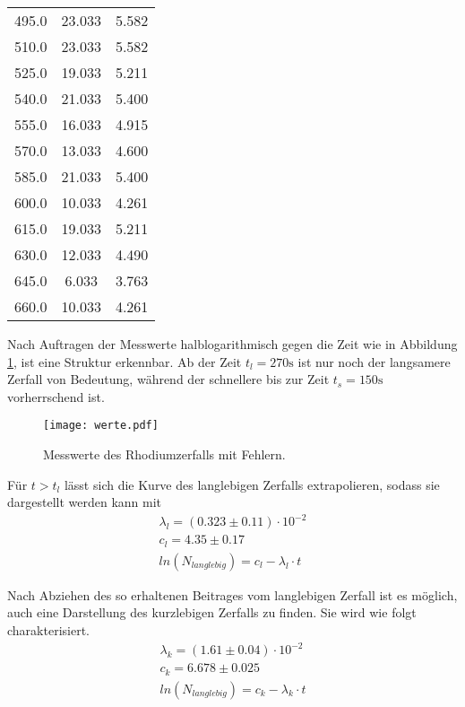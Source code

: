 \begin{table}
\begin{tabular}{c c c}
  495.0  & 23.033  & 5.582  \\
  510.0  & 23.033  & 5.582  \\
  525.0  & 19.033  & 5.211  \\
  540.0  & 21.033  & 5.400  \\
  555.0  & 16.033  & 4.915  \\
  570.0  & 13.033  & 4.600  \\
  585.0  & 21.033  & 5.400  \\
  600.0  & 10.033  & 4.261  \\
  615.0  & 19.033  & 5.211  \\
  630.0  & 12.033  & 4.490  \\
  645.0  & 6.033   & 3.763  \\
  660.0  & 10.033  & 4.261 \\
  \bottomrule
 \end{tabular}
\end{table}

\noindent Nach Auftragen der Messwerte halblogarithmisch gegen die Zeit wie in Abbildung \ref{fig:messf},
ist eine Struktur erkennbar. Ab der Zeit $t_l = 270 \si{\s}$ ist nur noch der langsamere Zerfall
von Bedeutung, während der schnellere bis zur Zeit $t_s = 150 \si{\s}$ vorherrschend ist.

\begin{figure}
 \centering
 \texttt{[image: werte.pdf]}
 \caption{Messwerte des Rhodiumzerfalls mit Fehlern.}
 \label{fig:messf}
\end{figure}

\noindent Für $t > t_l$ lässt sich die Kurve des langlebigen Zerfalls extrapolieren, sodass 
sie dargestellt werden kann mit
\begin{align*}
    \lambda_l = (0.323 \pm 0.11) \cdot 10^{-2}\\
    c_l = 4.35 \pm 0.17 \\
    ln(N_{langlebig}) = c_l - \lambda_l \cdot t
\end{align*}

Nach Abziehen des so erhaltenen Beitrages vom langlebigen Zerfall ist es möglich, auch
eine Darstellung des kurzlebigen Zerfalls zu finden. Sie wird wie folgt charakterisiert.
\begin{align*}
    \lambda_k = (1.61 \pm 0.04) \cdot 10^{-2}\\
    c_k = 6.678 \pm 0.025 \\
    ln(N_{langlebig}) = c_k - \lambda_k \cdot t
\end{align*}

